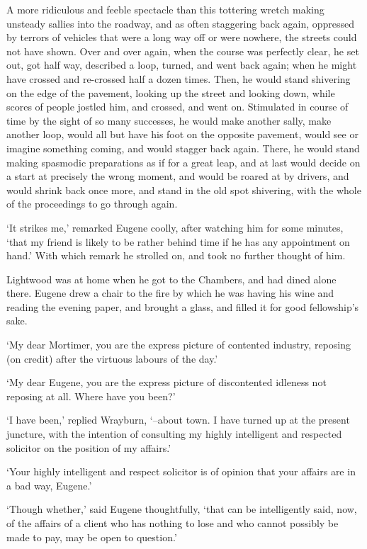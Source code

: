 A more ridiculous and feeble spectacle than this tottering wretch making
unsteady sallies into the roadway, and as often staggering back again,
oppressed by terrors of vehicles that were a long way off or were
nowhere, the streets could not have shown. Over and over again, when the
course was perfectly clear, he set out, got half way, described a loop,
turned, and went back again; when he might have crossed and re-crossed
half a dozen times. Then, he would stand shivering on the edge of the
pavement, looking up the street and looking down, while scores of people
jostled him, and crossed, and went on. Stimulated in course of time
by the sight of so many successes, he would make another sally, make
another loop, would all but have his foot on the opposite pavement,
would see or imagine something coming, and would stagger back again.
There, he would stand making spasmodic preparations as if for a great
leap, and at last would decide on a start at precisely the wrong moment,
and would be roared at by drivers, and would shrink back once more, and
stand in the old spot shivering, with the whole of the proceedings to go
through again.

‘It strikes me,’ remarked Eugene coolly, after watching him for some
minutes, ‘that my friend is likely to be rather behind time if he has
any appointment on hand.’ With which remark he strolled on, and took no
further thought of him.

Lightwood was at home when he got to the Chambers, and had dined alone
there. Eugene drew a chair to the fire by which he was having his wine
and reading the evening paper, and brought a glass, and filled it for
good fellowship’s sake.

‘My dear Mortimer, you are the express picture of contented industry,
reposing (on credit) after the virtuous labours of the day.’

‘My dear Eugene, you are the express picture of discontented idleness
not reposing at all. Where have you been?’

‘I have been,’ replied Wrayburn, ‘--about town. I have turned up at the
present juncture, with the intention of consulting my highly intelligent
and respected solicitor on the position of my affairs.’

‘Your highly intelligent and respect solicitor is of opinion that your
affairs are in a bad way, Eugene.’

‘Though whether,’ said Eugene thoughtfully, ‘that can be intelligently
said, now, of the affairs of a client who has nothing to lose and who
cannot possibly be made to pay, may be open to question.’

